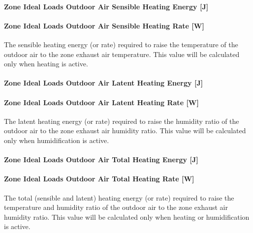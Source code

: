 \paragraph{Zone Ideal Loads Outdoor Air Sensible Heating Energy {[}J{]}}\label{zone-ideal-loads-outdoor-air-sensible-heating-energy-j}

\paragraph{Zone Ideal Loads Outdoor Air Sensible Heating Rate {[}W{]}}\label{zone-ideal-loads-outdoor-air-sensible-heating-rate-w}

The sensible heating energy (or rate) required to raise the temperature of the outdoor air to the zone exhaust air temperature. This value will be calculated only when heating is active.

\paragraph{Zone Ideal Loads Outdoor Air Latent Heating Energy {[}J{]}}\label{zone-ideal-loads-outdoor-air-latent-heating-energy-j}

\paragraph{Zone Ideal Loads Outdoor Air Latent Heating Rate {[}W{]}}\label{zone-ideal-loads-outdoor-air-latent-heating-rate-w}

The latent heating energy (or rate) required to raise the humidity ratio of the outdoor air to the zone exhaust air humidity ratio. This value will be calculated only when humidification is active.

\paragraph{Zone Ideal Loads Outdoor Air Total Heating Energy {[}J{]}}\label{zone-ideal-loads-outdoor-air-total-heating-energy-j}

\paragraph{Zone Ideal Loads Outdoor Air Total Heating Rate {[}W{]}}\label{zone-ideal-loads-outdoor-air-total-heating-rate-w}

The total (sensible and latent) heating energy (or rate) required to raise the temperature and humidity ratio of the outdoor air to the zone exhaust air humidity ratio. This value will be calculated only when heating or humidification is active.

